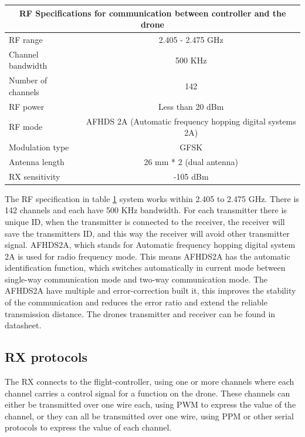 \begin{table}[H] \label{tab:RFSpec}
\begin{tabular}{|l|c|}
\hline
\multicolumn{2}{|c|}{\textbf{RF Specifications for communication between controller and the drone}}                               \\ \hline
RF range           & 2.405 - 2.475 GHz                                         \\ \hline
Channel bandwidth  & 500 KHz                                                   \\ \hline
Number of channels & 142                                                       \\ \hline
RF power           & Less than 20 dBm                                          \\ \hline
RF mode            & AFHDS 2A (Automatic frequency hopping digital systems 2A) \\ \hline
Modulation type    & GFSK                                                      \\ \hline
Antenna length     & 26 mm * 2 (dual antenna)                                  \\ \hline
RX sensitivity     & -105 dBm                                                  \\ \hline
\end{tabular}
\end{table}
The RF specification in table \ref{tab:RFSpec} system works within 2.405 to 2.475 GHz. There is 142 channels and each have 500 KHz bandwidth. For each transmitter there is unique ID, when the transmitter is connected to the receiver, the receiver will save the transmitters ID, and this way the receiver will avoid other transmitter signal.
AFHDS2A, which stands for Automatic frequency hopping digital system 2A is used for radio frequency mode. This means AFHDS2A has the automatic identification function, which switches automatically in current mode between single-way communication mode and two-way communication mode. The AFHDS2A have multiple and error-correction built it, this improves the stability of the communication and reduces the error ratio and extend the reliable transmission distance. The drones transmitter and receiver can be found in datasheet.










\subsection{RX protocols}\label{ss:rxprotococls} 
The RX connects to the flight-controller, using one or more channels where each channel carries a control signal for a function on the drone. These channels can either be transmitted over one wire each, using PWM to express the value of the channel, or they can all be transmitted over one wire, using PPM or other serial protocols to express the value of each channel.\\

